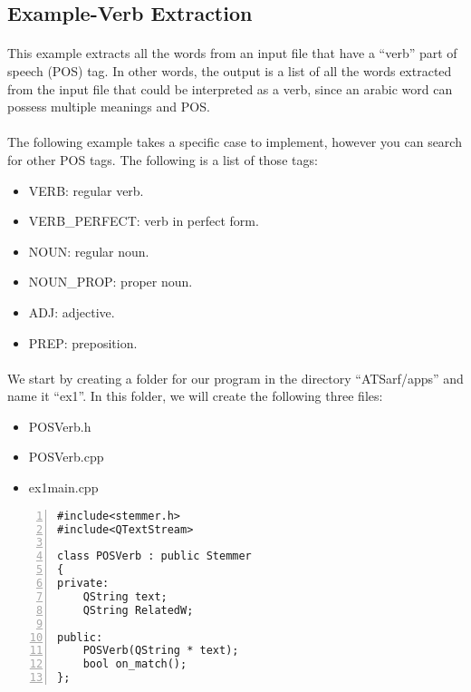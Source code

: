 \documentclass{article}
\begin{document}
\subsection{Example-Verb Extraction}
\paragraph{}
This example extracts all the words from an input file that have a ``verb'' part of speech (POS) tag. In other words, the output is a list of all the words extracted from the input file that could be interpreted as a verb, since an arabic word can possess multiple meanings and POS.

\paragraph{}
The following example takes a specific case to implement, however you can search for other POS tags. The following is a list of those tags:
\begin{itemize}
\item VERB: regular verb.
\item VERB\_PERFECT: verb in perfect form.
\item NOUN: regular noun.
\item NOUN\_PROP: proper noun.
\item ADJ: adjective.
\item PREP: preposition.
\end{itemize}

\paragraph{}
We start by creating a folder for our program in the directory ``ATSarf/apps'' and name it ``ex1''. In this folder, we will create the following three files:
\begin{itemize}
\item POSVerb.h
\item POSVerb.cpp
\item ex1main.cpp
\end{itemize}

\begin{Verbatim}[numbers=left]
#include<stemmer.h>
#include<QTextStream>

class POSVerb : public Stemmer
{
private:
    QString text;
    QString RelatedW;

public:
    POSVerb(QString * text);
    bool on_match();
};
\end{Verbatim}
\end{document}
